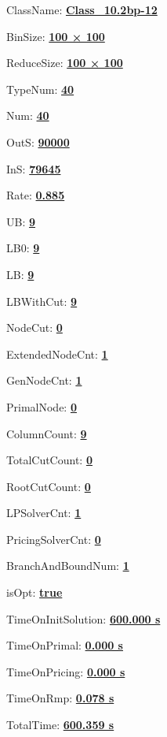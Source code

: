 \documentclass[11pt]{article}
\begin{document}
\pagestyle{empty}


ClassName: \underline{\textbf{Class_10.2bp-12}}
\par
BinSize: \underline{\textbf{100 × 100}}
\par
ReduceSize: \underline{\textbf{100 × 100}}
\par
TypeNum: \underline{\textbf{40}}
\par
Num: \underline{\textbf{40}}
\par
OutS: \underline{\textbf{90000}}
\par
InS: \underline{\textbf{79645}}
\par
Rate: \underline{\textbf{0.885}}
\par
UB: \underline{\textbf{9}}
\par
LB0: \underline{\textbf{9}}
\par
LB: \underline{\textbf{9}}
\par
LBWithCut: \underline{\textbf{9}}
\par
NodeCut: \underline{\textbf{0}}
\par
ExtendedNodeCnt: \underline{\textbf{1}}
\par
GenNodeCnt: \underline{\textbf{1}}
\par
PrimalNode: \underline{\textbf{0}}
\par
ColumnCount: \underline{\textbf{9}}
\par
TotalCutCount: \underline{\textbf{0}}
\par
RootCutCount: \underline{\textbf{0}}
\par
LPSolverCnt: \underline{\textbf{1}}
\par
PricingSolverCnt: \underline{\textbf{0}}
\par
BranchAndBoundNum: \underline{\textbf{1}}
\par
isOpt: \underline{\textbf{true}}
\par
TimeOnInitSolution: \underline{\textbf{600.000 s}}
\par
TimeOnPrimal: \underline{\textbf{0.000 s}}
\par
TimeOnPricing: \underline{\textbf{0.000 s}}
\par
TimeOnRmp: \underline{\textbf{0.078 s}}
\par
TotalTime: \underline{\textbf{600.359 s}}
\par
\newpage


\end{document}
